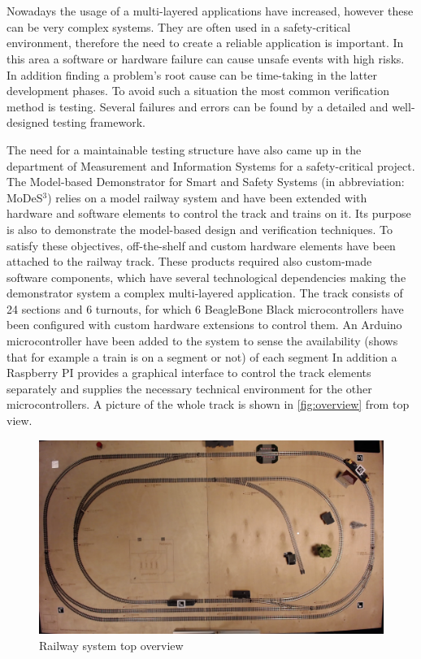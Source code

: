 \chapter{\bevezetes}
Nowadays the usage of a multi-layered applications have increased, however these can be very complex systems. They are often used in a safety-critical environment, therefore the need to create a reliable application is important. In this area a software or hardware failure can cause unsafe events with high risks. In addition finding a problem's root cause can be time-taking in the latter development phases. To avoid such a situation the most common verification method is testing. Several failures and errors can be found by a detailed and well-designed testing framework.

The need for a maintainable testing structure have also came up in the department of Measurement and Information Systems for a safety-critical project. The Model-based Demonstrator for Smart and Safety Systems (in abbreviation: MoDeS$^3$) relies on a model railway system and have been extended with hardware and software elements to control the track and trains on it. Its purpose is also to demonstrate the model-based design and verification techniques. To satisfy these objectives, off-the-shelf and custom hardware elements have been attached to the railway track. These products required also custom-made software components, which have several technological dependencies making the demonstrator system a complex multi-layered application. The track consists of 24 sections and 6 turnouts, for which 6 BeagleBone Black microcontrollers have been configured with custom hardware extensions to control them. An Arduino microcontroller have been added to the system to sense the availability (shows that for example a train is on a segment or not) of each segment In addition a Raspberry PI provides a graphical interface to control the track elements separately and supplies the necessary technical environment for the other microcontrollers. A picture of the whole track is shown in \autoref{fig:overview} from top view.

\begin{figure}[ht]
	\centering
	\includegraphics[width=150mm, keepaspectratio, angle = 180]{figures/modes3/overview.jpg}
	\caption{Railway system top overview}
	\label{fig:overview}
\end{figure}

